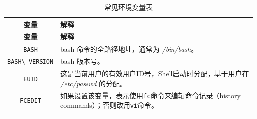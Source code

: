 \documentclass[doctor,openright,twoside]{sjtuthesis}
\newcommand{\passthrough}[1]{#1}
\theoremstyle{plain}
\theoremstyle{definition}
\theoremstyle{remark}
\theoremstyle{ocrenumbox}
\theoremstyle{plain}
\begin{document}
\begin{longtable}[]{@{}cl@{}}
\caption{常见环境变量表}\tabularnewline
\toprule
\begin{minipage}[b]{0.23\columnwidth}\centering
\textbf{变量}\strut
\end{minipage} & \begin{minipage}[b]{0.72\columnwidth}\raggedright
\textbf{解释}\strut
\end{minipage}\tabularnewline
\midrule
\endfirsthead
\toprule
\begin{minipage}[b]{0.23\columnwidth}\centering
\textbf{变量}\strut
\end{minipage} & \begin{minipage}[b]{0.72\columnwidth}\raggedright
\textbf{解释}\strut
\end{minipage}\tabularnewline
\midrule
\endhead
\begin{minipage}[t]{0.23\columnwidth}\centering
\passthrough{\lstinline!BASH!}\strut
\end{minipage} & \begin{minipage}[t]{0.72\columnwidth}\raggedright
bash 命令的全路径地址，通常为 \emph{/bin/bash}。\strut
\end{minipage}\tabularnewline
\begin{minipage}[t]{0.23\columnwidth}\centering
\passthrough{\lstinline!BASH\_VERSION!}\strut
\end{minipage} & \begin{minipage}[t]{0.72\columnwidth}\raggedright
bash 版本号。\strut
\end{minipage}\tabularnewline
\begin{minipage}[t]{0.23\columnwidth}\centering
\passthrough{\lstinline!EUID!}\strut
\end{minipage} & \begin{minipage}[t]{0.72\columnwidth}\raggedright
这是当前用户的有效用户ID号，Shell启动时分配，基于用户在
\emph{/etc/passwd} 的分配。\strut
\end{minipage}\tabularnewline
\begin{minipage}[t]{0.23\columnwidth}\centering
\passthrough{\lstinline!FCEDIT!}\strut
\end{minipage} & \begin{minipage}[t]{0.72\columnwidth}\raggedright
如果设置该变量，表示使用\passthrough{\lstinline!fc!}命令来编辑命令记录（history
commands）；否则改用\passthrough{\lstinline!vi!}命令。\strut
\end{minipage}\tabularnewline
\begin{minipage}[t]{0.23\columnwidth}\centering

\end{minipage}
\end{longtable}
\end{document}
